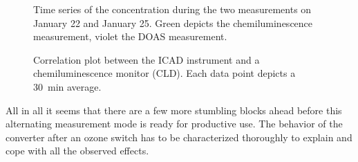 \begin{figure}[htbp]
  \centering
  
  \hfill
  
  \caption{Time series of the  concentration during the two
    measurements on January 22 and January 25. Green depicts the
    chemiluminescence measurement, violet the DOAS measurement.}
  \label{fig:corr-ts}
\end{figure}
\begin{figure}[htbp]
  \centering
  
  \caption{Correlation plot between the  ICAD instrument and
    a chemiluminescence monitor (CLD). Each data point depicts a
    \SI{30}{\minute} average.}
  \label{fig:cld-corr}
\end{figure}

All in all it seems that there are a few more stumbling blocks ahead
before this alternating measurement mode is ready for productive
use. The behavior of the converter after an ozone switch has to be
characterized thoroughly to explain and cope with all the observed
effects.

